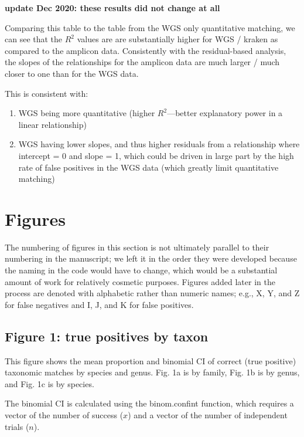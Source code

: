 \documentclass[
]{article}
\providecommand{\tightlist}{%
  \setlength{\itemsep}{0pt}\setlength{\parskip}{0pt}}
\begin{document}
\textbf{update Dec 2020: these results did not change at all}

Comparing this table to the table from the WGS only quantitative
matching, we can see that the \(R^2\) values are are substantially
higher for WGS / kraken as compared to the amplicon data. Consistently
with the residual-based analysis, the slopes of the relationships for
the amplicon data are much larger / much closer to one than for the WGS
data.

This is consistent with:

\begin{enumerate}
\def\labelenumi{\arabic{enumi}.}
\tightlist
\item
  WGS being more quantitative (higher \(R^2\)---better explanatory power
  in a linear relationship)
\item
  WGS having lower slopes, and thus higher residuals from a relationship
  where intercept = 0 and slope = 1, which could be driven in large part
  by the high rate of false positives in the WGS data (which greatly
  limit quantitative matching)
\end{enumerate}

\hypertarget{figures}{%
\section{Figures}\label{figures}}

The numbering of figures in this section is not ultimately parallel to
their numbering in the manuscript; we left it in the order they were
developed because the naming in the code would have to change, which
would be a substantial amount of work for relatively cosmetic purposes.
Figures added later in the process are denoted with alphabetic rather
than numeric names; e.g., X, Y, and Z for false negatives and I, J, and
K for false positives.

\hypertarget{figure-1-true-positives-by-taxon}{%
\subsection{Figure 1: true positives by
taxon}\label{figure-1-true-positives-by-taxon}}

This figure shows the mean proportion and binomial CI of correct (true
positive) taxonomic matches by species and genus. Fig. 1a is by family,
Fig. 1b is by genus, and Fig. 1c is by species.

The binomial CI is calculated using the binom.confint function, which
requires a vector of the number of success (\(x\)) and a vector of the
number of independent trials (\(n\)).
\end{document}
